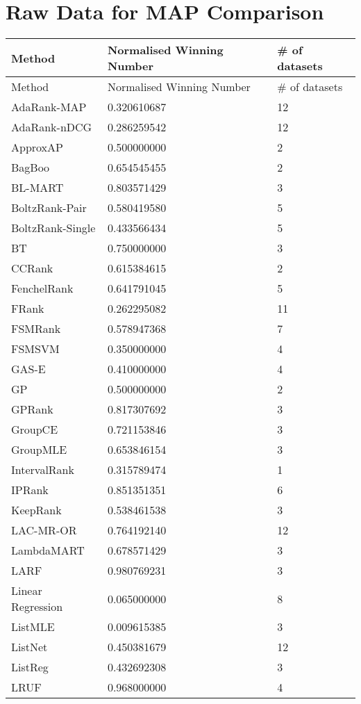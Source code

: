 \chapter{Raw Data for MAP Comparison}
\label{app:norm_winnum_map}

\begin{longtable}{l|l|l}
Method & Normalised Winning Number & \# of datasets \\
\hline
Method & Normalised Winning Number & \# of datasets \\ 
AdaRank-\acs{MAP} & 0.320610687 & 12 \\ 
AdaRank-\acs{nDCG} & 0.286259542 & 12 \\ 
Approx\acs{AP} & 0.500000000 & 2 \\ 
BagBoo & 0.654545455 & 2 \\ 
BL-MART & 0.803571429 & 3 \\ 
BoltzRank-Pair & 0.580419580 & 5 \\ 
BoltzRank-Single & 0.433566434 & 5 \\ 
BT & 0.750000000 & 3 \\ 
CCRank & 0.615384615 & 2 \\ 
FenchelRank & 0.641791045 & 5 \\ 
FRank & 0.262295082 & 11 \\ 
FSMRank & 0.578947368 & 7 \\ 
FSM\acs{SVM} & 0.350000000 & 4 \\ 
GAS-E & 0.410000000 & 4 \\ 
\acs{GP} & 0.500000000 & 2 \\ 
\acs{GP}Rank & 0.817307692 & 3 \\ 
GroupCE & 0.721153846 & 3 \\ 
Group\acs{MLE} & 0.653846154 & 3 \\ 
IntervalRank & 0.315789474 & 1 \\ 
\acs{IP}Rank & 0.851351351 & 6 \\ 
KeepRank & 0.538461538 & 3 \\ 
LAC-MR-OR & 0.764192140 & 12 \\ 
LambdaMART & 0.678571429 & 3 \\ 
LARF & 0.980769231 & 3 \\ 
Linear Regression & 0.065000000 & 8 \\ 
List\acs{MLE} & 0.009615385 & 3 \\ 
ListNet & 0.450381679 & 12 \\ 
ListReg & 0.432692308 & 3 \\ 
LRUF & 0.968000000 & 4 \\ 

\end{longtable}

